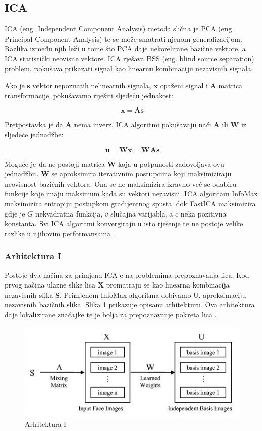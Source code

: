 \documentclass[times, utf8, seminar, numeric]{fer}
\renewcommand{\vec}[1]{\mathbf{#1}}
\begin{document}
\subsection{ICA}

ICA (eng. Independent Component Analysis) metoda slična je PCA (eng. Principal Component Analysis) te se može smatrati njenom generalizacijom. Razlika između njih leži u tome što PCA daje nekorelirane bazične vektore, a ICA statistički neovisne vektore. ICA rješava BSS (eng. blind source separation) problem, pokušava prikazati signal kao linearnu kombinaciju nezavisnih signala.

Ako je $\vec{s}$ vektor nepoznatih nelinearnih signala, $\vec{x}$ opaženi signal i $\vec{A}$ matrica transformacije, pokušavamo riješiti sljedeću jednakost:

\[
\vec{x} = \vec{A} \vec{s}
\]

Pretpostavka je da $\vec{A}$ nema inverz. ICA algoritmi pokušavaju naći $\vec{A}$ ili $\vec{W}$ iz sljedeće jednadžbe:

\[
\vec{u} = \vec{W} \vec{x} = \vec{W} \vec{A} \vec{s}
\]

Moguće je da ne postoji matrica $\vec{W}$ koja u potpunosti zadovoljava ovu jednadžbu. $\vec{W}$ se aproksimira iterativnim postupcima koji maksimiziraju neovisnost bazičnih vektora. Ona se ne maksimizira izravno već se odabiru funkcije koje imaju maksimum kada su vektori nezavisni.
ICA algoritam InfoMax maksimizira entropiju postupkom gradijentnog spusta, dok FastICA maksimizira gdje je $G$ nekvadratna funkcija, $v$ slučajna varijabla, a $c$ neka pozitivna konstanta. Svi ICA algoritmi konvergiraju u isto rješenje te ne postoje velike razlike u njihovim performansama \cite{Draper:2003:RFP:950135.950141}.

\subsubsection{Arhitektura I}
Postoje dva načina za primjenu ICA-e na problemima prepoznavanja lica. Kod prvog načina ulazne slike lica $\vec{X}$ promatraju se kao linearna kombinacija nezavisnih slika $\vec{S}$. Primjenom InfoMax algoritma dobivamo U, aproksimaciju nezavisnih bazičnih slika. Slika \ref{fig:prepoznavanje_arh1} prikazuje opisanu arhitekturu. Ova arhitektura daje lokalizirane značajke te je bolja za prepoznavanje pokreta lica \cite{Draper:2003:RFP:950135.950141}.

\begin{figure}[!htb]
\centering
\includegraphics{raw/prepoznavanje_arh1.jpg}
\caption{Arhitektura I}
\label{fig:prepoznavanje_arh1}
\end{figure}
\end{document}
